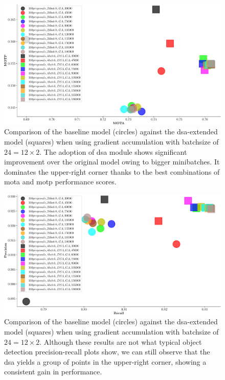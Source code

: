 \begin{figure}[t]
    \centerline{\includegraphics[width=\linewidth]{figures/siamese_tracking/tracker_cmp_160_2x12_vs_160_2x2_DSA_GA_MOTA_MOTP.pdf}}
    \caption[\gls{dsa} evaluation with gradient accumulation - primary metrics]{Comparison of the baseline model (circles) against the \gls{dsa}-extended model (squares) when using gradient accumulation with batchsize of $24 = 12 \times 2$. The adoption of \gls{dsa} module shows significant improvement over the original model owing to bigger minibatches. It dominates the upper-right corner thanks to the best combinations of \gls{mota} and \gls{motp} performance scores.}
    \label{fig:OrigVsDSA_160RPN_GA_MOTA_MOTP}
\end{figure}

\begin{figure}[t]
    \centerline{\includegraphics[width=\linewidth]{figures/siamese_tracking/tracker_cmp_160_2x12_vs_160_2x2_DSA_GA_rec_prec.pdf}}
    \caption[\gls{dsa} evaluation with gradient accumulation - secondary metrics]{Comparison of the baseline model (circles) against the \gls{dsa}-extended model (squares) when using gradient accumulation with batchsize of $24 = 12 \times 2$. Although these results are not what typical object detection precision-recall plots show, we can still observe that the \gls{dsa} yields a group of points in the upper-right corner, showing a consistent gain in performance.}
    \label{fig:OrigVsDSA_160RPN_GA_Prec_Rec}
\end{figure}

